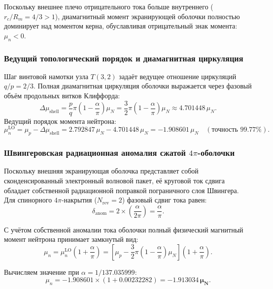 \documentclass[11pt,a4paper]{article}
\theoremstyle{definition}
\theoremstyle{remark}
\begin{document}
Поскольку внешнее плечо отрицательного тока больше внутреннего ($r_c / R_m = 4/3 > 1$), диамагнитный момент экранирующей оболочки полностью доминирует над моментом керна, обуславливая отрицательный знак момента: $\mu_n < 0$.

\subsubsection{Ведущий топологический порядок и диамагнитная циркуляция}

Шаг винтовой намотки узла $T(3,2)$ задаёт ведущее отношение циркуляций $q/p = 2/3$. Полная диамагнитная циркуляция оболочки выражается через фазовый объём продольных витков Клиффорда:
\begin{equation}
\Delta \mu_{\mathrm{shell}} = \frac{p}{q} \pi \left(1 - \frac{\alpha}{\pi}\right) \mu_N = \frac{3}{2}\pi \left(1 - \frac{\alpha}{\pi}\right) \mu_N \approx 4.701448\,\mu_N.
\end{equation}
Ведущий порядок момента нейтрона:
\begin{equation}
\mu_n^{\mathrm{LO}} = \mu_p - \Delta \mu_{\mathrm{shell}} = 2.792847\,\mu_N - 4.701448\,\mu_N = -1.908601\,\mu_N \quad (\text{точность } 99.77\%).
\end{equation}

\subsubsection{Швингеровская радиационная аномалия сжатой $4\pi$-оболочки}

Поскольку внешняя экранирующая оболочка представляет собой сконденсированный электронный волновой пакет, её круговой ток сдвига обладает собственной радиационной поправкой пограничного слоя Швингера. Для спинорного $4\pi$-накрытия ($N_{\mathrm{rev}} = 2$) фазовый сдвиг тока равен:
\begin{equation}
\delta_{\mathrm{anom}} = 2 \times \left(\frac{\alpha}{2\pi}\right) = \frac{\alpha}{\pi}.
\end{equation}

С учётом собственной аномалии тока оболочки полный физический магнитный момент нейтрона принимает замкнутый вид:
\begin{equation}
\mu_n = \mu_n^{\mathrm{LO}} \left(1 + \frac{\alpha}{\pi}\right) = \left[ \mu_p - \frac{3}{2}\pi\left(1 - \frac{\alpha}{\pi}\right)\mu_N \right] \left(1 + \frac{\alpha}{\pi}\right).
\end{equation}

Вычисляем значение при $\alpha = 1/137.035999$:
\begin{equation}
\mu_n = -1.908601 \times \left(1 + 0.00232282\right) = \mathbf{-1.913034\,\mu_N}.
\end{equation}
\end{document}
